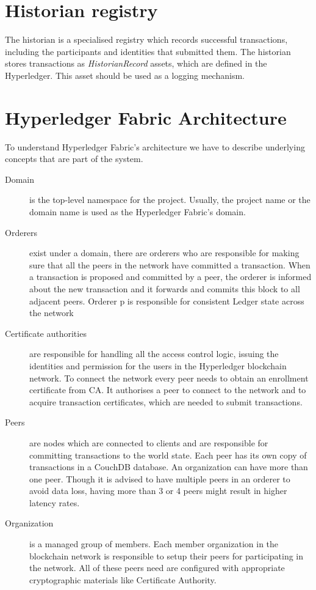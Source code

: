 \section{Historian registry}
The historian is a specialised registry which records successful transactions, including the participants and identities that submitted them. The historian stores transactions as \emph{HistorianRecord} assets, which are defined in the Hyperledger. 
This asset should be used as a logging mechanism.


\section{Hyperledger Fabric Architecture}

To understand Hyperledger Fabric's architecture we have to describe underlying concepts that are part of the system.

\begin{description}

\item[Domain] is the top-level namespace for the project. Usually, the project name or the domain name is used as the Hyperledger Fabric’s domain.


\item[Orderers] exist under a domain, there are orderers who are responsible for making sure that all the peers in the network have committed a transaction. When a transaction is proposed and committed by a peer, the orderer is informed about the new transaction and it forwards and commits this block to all adjacent peers. Orderer p is responsible for consistent Ledger state across the network

\item[Certificate authorities] are responsible for handling all the access control logic, issuing the identities and permission for the users in the Hyperledger blockchain network. To connect the network every peer needs to obtain an enrollment certificate from   CA. It authorises a peer to connect to the network and to acquire transaction certificates, which are needed to submit transactions. 

\item[Peers] are nodes which are connected to clients and are responsible for committing transactions to the world state. Each peer has its own copy of transactions in a CouchDB database. An organization can have more than one peer. Though it is advised to have multiple peers in an orderer to avoid data loss, having more than 3 or 4 peers might result in higher latency rates.

\item[Organization] is a managed group of members. Each member organization in the blockchain network is responsible to setup their peers for participating in the network. All of these peers need are configured with appropriate cryptographic materials like Certificate Authority.

\end{description}

